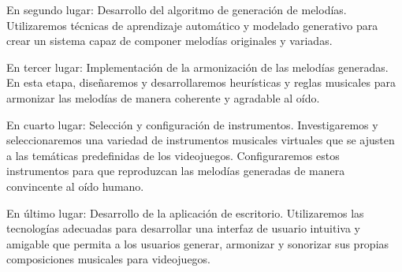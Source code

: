 En segundo lugar: Desarrollo del algoritmo de generación de melodías. Utilizaremos técnicas de aprendizaje automático y modelado generativo para crear un sistema capaz de componer melodías originales y variadas.

En tercer lugar: Implementación de la armonización de las melodías generadas. En esta etapa, diseñaremos y desarrollaremos heurísticas y reglas musicales para armonizar las melodías de manera coherente y agradable al oído.

En cuarto lugar: Selección y configuración de instrumentos. Investigaremos y seleccionaremos una variedad de instrumentos musicales virtuales que se ajusten a las temáticas predefinidas de los videojuegos. Configuraremos estos instrumentos para que reproduzcan las melodías generadas de manera convincente al oído humano.

En último lugar: Desarrollo de la aplicación de escritorio. Utilizaremos las tecnologías adecuadas para desarrollar una interfaz de usuario intuitiva y amigable que permita a los usuarios generar, armonizar y sonorizar sus propias composiciones musicales para videojuegos.


\lipsum[0]